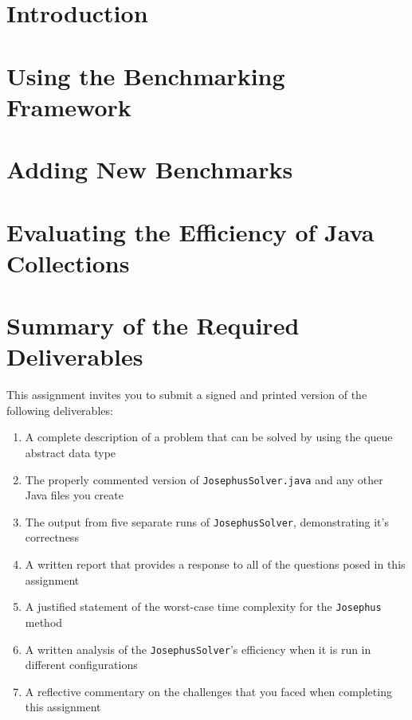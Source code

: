 


\usepackage[compact]{titlesec}


\section*{Introduction}


\section*{Using the Benchmarking Framework}


\section*{Adding New Benchmarks}


\section*{Evaluating the Efficiency of Java Collections}


\section*{Summary of the Required Deliverables}

  This assignment invites you to submit a signed and printed version of the following deliverables:

  \begin{enumerate}

  \item A complete description of a problem that can be solved by using the queue abstract data type

  \item The properly commented version of {\tt JosephusSolver.java} and any other Java files you create

  \item The output from five separate runs of {\tt JosephusSolver}, demonstrating it's correctness

  \item A written report that provides a response to all of the questions posed in this assignment

  \item A justified statement of the worst-case time complexity for the {\tt Josephus} method

  \item A written analysis of the {\tt JosephusSolver}'s efficiency when it is run in different configurations

  \item A reflective commentary on the challenges that you faced when completing this assignment

  \end{enumerate}

